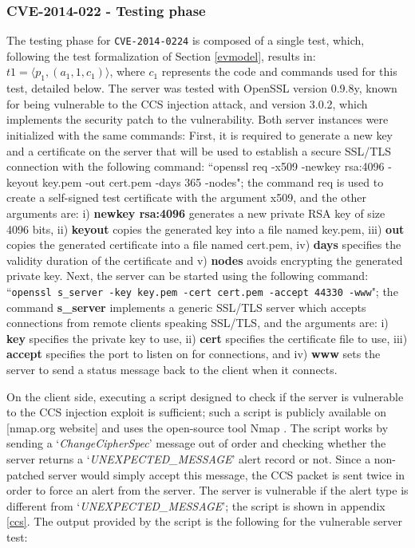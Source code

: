 \subsubsection{CVE-2014-022 - Testing phase}
The testing phase for \texttt{CVE-2014-0224} is composed of a single test, which, following the test formalization of Section \ref{evmodel}, results in: \(t1 = \langle p_1, (a_1, 1, c_1) \rangle\), where \(c_1\) represents the code and commands used for this test, detailed below. The server was tested with OpenSSL version 0.9.8y, known for being vulnerable to the CCS injection attack, and version 3.0.2, which implements the security patch to the vulnerability. Both server instances were initialized with the same commands: First, it is required to generate a new key and a certificate on the server that will be used to establish a secure SSL/TLS connection with the following command:
``openssl req -x509 -newkey rsa:4096 -keyout key.pem -out cert.pem -days 365 -nodes"; the command req is used to create a self-signed test certificate with the argument x509, and the other arguments are: i) \textbf{newkey rsa:4096} generates a new private RSA key of size 4096 bits, ii) \textbf{keyout} copies the generated key into a file named key.pem, iii) \textbf{out} copies the generated certificate into a file named cert.pem, iv) \textbf{days} specifies the validity duration of the certificate and v) \textbf{nodes} avoids encrypting the generated private key.
Next, the server can be started using the following command:
``\texttt{openssl s\_server -key key.pem -cert cert.pem -accept 44330 -www}"; the command \textbf{s\_server} implements a generic SSL/TLS server which accepts connections from remote clients speaking SSL/TLS, and the arguments are: i) \textbf{key} specifies the private key to use, ii) \textbf{cert} specifies the certificate file to use, iii) \textbf{accept} specifies the port to listen on for connections, and iv) \textbf{www} sets the server to send a status message back to the client when it connects.

On the client side, executing a script designed to check if the server is vulnerable to the CCS injection exploit is sufficient; such a script is publicly available on [nmap.org website] and uses the open-source tool Nmap \cite{nmap}. The script works by sending a `\textit{ChangeCipherSpec}' message out of order and checking whether the server returns a `\textit{UNEXPECTED\_MESSAGE}' alert record or not. Since a non-patched server would simply accept this message, the CCS packet is sent twice in order to force an alert from the server. The server is vulnerable if the alert type is different from `\textit{UNEXPECTED\_MESSAGE}'; the script is shown in appendix \ref{ccs}. The output provided by the script is the following for the vulnerable server test:  

